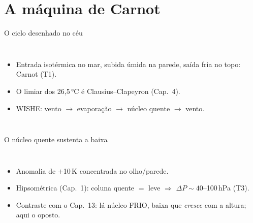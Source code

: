 \documentclass[aspectratio=169,11pt]{beamer}
\begin{document}
\section{A máquina de Carnot}

\begin{frame}{O ciclo desenhado no céu}
  \begin{columns}
    \vspace{0.4em}
    \begin{itemize}
      \item Entrada isotérmica no mar, subida úmida na parede, saída
            fria no topo: Carnot (T1).
      \item O limiar dos 26{,}5\,°C é Clausius--Clapeyron (Cap.~4).
      \item WISHE: vento $\to$ evaporação $\to$ núcleo quente $\to$
            vento.
    \end{itemize}
  \end{columns}
\end{frame}

\begin{frame}{O núcleo quente sustenta a baixa}
  \begin{columns}
    \begin{itemize}
      \item Anomalia de $+$10\,K concentrada no olho/parede.
      \item Hipsométrica (Cap.~1): coluna quente $=$ leve $\Rightarrow$
            $\Delta P \sim 40$--100\,hPa (T3).
      \item Contraste com o Cap.~13: lá núcleo FRIO, baixa que
            \emph{cresce} com a altura; aqui o oposto.
    \end{itemize}
  \end{columns}
\end{frame}
\end{document}
